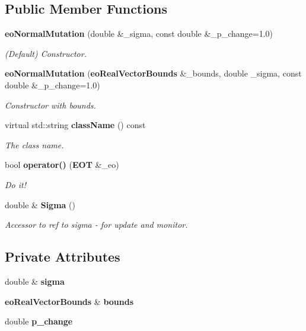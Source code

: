 \subsection*{Public Member Functions}
\begin{CompactItemize}
\item 
{\bf eo\-Normal\-Mutation} (double \&\_\-sigma, const double \&\_\-p\_\-change=1.0)
\begin{CompactList}\small\item\em (Default) Constructor. \item\end{CompactList}\item 
{\bf eo\-Normal\-Mutation} ({\bf eo\-Real\-Vector\-Bounds} \&\_\-bounds, double \_\-sigma, const double \&\_\-p\_\-change=1.0)
\begin{CompactList}\small\item\em Constructor with bounds. \item\end{CompactList}\item 
virtual std::string {\bf class\-Name} () const \label{classeo_normal_mutation_a2}

\begin{CompactList}\small\item\em The class name. \item\end{CompactList}\item 
bool {\bf operator()} ({\bf EOT} \&\_\-eo)
\begin{CompactList}\small\item\em Do it! \item\end{CompactList}\item 
double \& {\bf Sigma} ()\label{classeo_normal_mutation_a4}

\begin{CompactList}\small\item\em Accessor to ref to sigma - for update and monitor. \item\end{CompactList}\end{CompactItemize}
\subsection*{Private Attributes}
\begin{CompactItemize}
\item 
double \& {\bf sigma}\label{classeo_normal_mutation_r0}

\item 
{\bf eo\-Real\-Vector\-Bounds} \& {\bf bounds}\label{classeo_normal_mutation_r1}

\item 
double {\bf p\_\-change}\label{classeo_normal_mutation_r2}

\end{CompactItemize}


